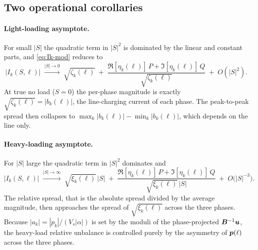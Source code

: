 \subsection{Two operational corollaries}

\paragraph{Light-loading asymptote.}
For small $|S|$ the quadratic term in $|S|^{2}$ is dominated by the
linear and constant parts, and \autoref{eq:Ik-mod} reduces to
%
\begin{equation}
\label{eq:lightloading}
\bigl|I_{k}(S,\ell)\bigr|
\;\xrightarrow{|S|\to 0}\;
\sqrt{\zeta_{k}(\ell)}
\;+\;
\frac{\Re[\eta_{k}(\ell)]\,P + \Im[\eta_{k}(\ell)]\,Q}{\sqrt{\zeta_{k}(\ell)}}
\;+\;
O(|S|^{2}).
\end{equation}
%
\noindent At true no load ($S=0$) the per-phase magnitude is exactly
$\sqrt{\zeta_{k}(\ell)}=|b_{k}(\ell)|$, the line-charging current of
each phase. The peak-to-peak spread then collapses to
$\max_{k}|b_{k}(\ell)|-\min_{k}|b_{k}(\ell)|$, which depends on the line
only.

\paragraph{Heavy-loading asymptote.}
For $|S|$ large the quadratic term in $|S|^{2}$ dominates and
%
\begin{equation}
\label{eq:heavyloading}
\bigl|I_{k}(S,\ell)\bigr|
\;\xrightarrow{|S|\to\infty}\;
\sqrt{\xi_{k}(\ell)}\,|S|
\;+\;
\frac{\Re[\eta_{k}(\ell)]\,P + \Im[\eta_{k}(\ell)]\,Q}{\sqrt{\xi_{k}(\ell)}\,|S|}
\;+\;
O\!\bigl(|S|^{-3}\bigr).
\end{equation}
%
\noindent The relative spread, that is the absolute spread divided by
the average magnitude, then approaches the spread of
$\sqrt{\xi_{k}(\ell)}$ across the three phases. Because
$|a_{k}|=|p_{k}|/(V_{s}|\alpha|)$ is set by the moduli of the
phase-projected $\bm{B}^{-1}\bm{u}$, the heavy-load relative unbalance is
controlled purely by the asymmetry of $\bm{p}(\ell)$ across the three
phases.
